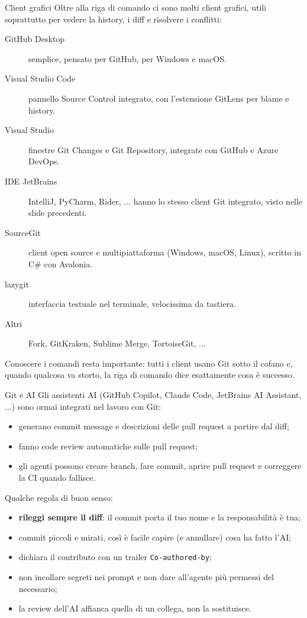 \documentclass[aspectratio=169,handout,10pt]{beamer}
\begin{document}
\begin{frame}{Client grafici}
    Oltre alla riga di comando ci sono molti client grafici, utili soprattutto per vedere la history, i diff e risolvere i conflitti:
    \begin{description}
        \item[GitHub Desktop] semplice, pensato per GitHub, per Windows e macOS.
        \item[Visual Studio Code] pannello Source Control integrato, con l'estensione GitLens per blame e history.
        \item[Visual Studio] finestre Git Changes e Git Repository, integrate con GitHub e Azure DevOps.
        \item[IDE JetBrains] IntelliJ, PyCharm, Rider, ... hanno lo stesso client Git integrato, visto nelle slide precedenti.
        \item[SourceGit] client open source e multipiattaforma (Windows, macOS, Linux), scritto in C\# con Avalonia.
        \item[lazygit] interfaccia testuale nel terminale, velocissima da tastiera.
        \item[Altri] Fork, GitKraken, Sublime Merge, TortoiseGit, ...
    \end{description}
    Conoscere i comandi resta importante: tutti i client usano Git sotto il cofano e, quando qualcosa va storto, la riga di comando dice esattamente cosa è successo.
\end{frame}
\begin{frame}{Git e AI}
    Gli assistenti AI (GitHub Copilot, Claude Code, JetBrains AI Assistant, ...) sono ormai integrati nel lavoro con Git:
    \begin{itemize}
        \item generano commit message e descrizioni delle pull request a partire dal diff;
        \item fanno code review automatiche sulle pull request;
        \item gli agenti possono creare branch, fare commit, aprire pull request e correggere la CI quando fallisce.
    \end{itemize}
    Qualche regola di buon senso:
    \begin{itemize}
        \item \textbf{rileggi sempre il diff}: il commit porta il tuo nome e la responsabilità è tua;
        \item commit piccoli e mirati, così è facile capire (e annullare) cosa ha fatto l'AI;
        \item dichiara il contributo con un trailer \texttt{Co-authored-by};
        \item non incollare segreti nei prompt e non dare all'agente più permessi del necessario;
        \item la review dell'AI affianca quella di un collega, non la sostituisce.
    \end{itemize}
\end{frame}
\end{document}
